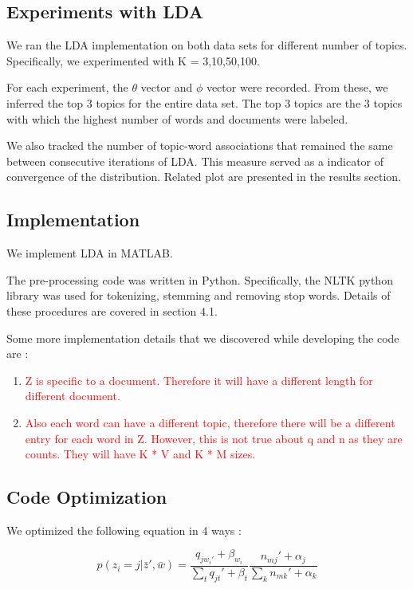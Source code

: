 \documentclass[11pt,a4paper,oneside]{article}
\def\red{\textcolor{red}}
\begin{document}
\subsection{Experiments with LDA}
We ran the LDA implementation on both data sets for different number of topics. Specifically, we experimented with K = 3,10,50,100. 

For each experiment, the $\theta$ vector and $\phi$ vector were recorded. From these, we inferred the top 3 topics for the entire data set. The top 3 topics are the 3 topics with which the highest number of words and documents were labeled.

We also tracked the number of topic-word associations that remained the same between consecutive iterations of LDA. This measure served as a indicator of convergence of the distribution. Related plot are presented in the results section.

\subsection{Implementation}
We implement LDA in \textsc{MATLAB}.

The pre-processing code was written in Python. Specifically, the NLTK python library was used for tokenizing, stemming and removing stop words. Details of these procedures are covered in section 4.1.

Some more implementation details that we discovered while developing the code are :

\begin{enumerate}
  \item \red{Z is specific to a document. Therefore it will have a different length for different document.}
  \item \red{Also each word can have a different topic, therefore there will be a different entry for each word in Z. However, this is not true about q and n as they are counts. They will have K * V and K * M sizes.}
\end{enumerate}

\subsection{Code Optimization}
We optimized the following equation in 4 ways :

\begin{equation}
p(z_i = j | \bar{z}', \bar{w}) = \frac{q_{j w_{i}'} + \beta_{w_i}}{\sum_t{q_{jt}' + \beta_t}}\frac{n_{mj}' + \alpha_j}{\sum_k{n_{mk}' + \alpha_k}}
\end{equation}
\end{document}

